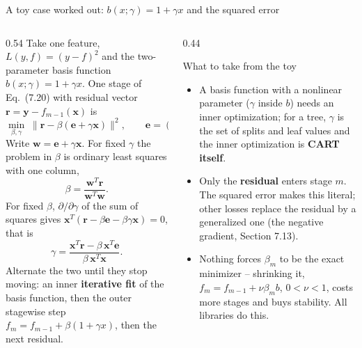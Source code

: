\documentclass[10pt,aspectratio=169]{beamer}
\begin{document}
\begin{frame}{A toy case worked out: $b(x;\gamma)=1+\gamma x$ and the squared error}
\begin{columns}[T]
\begin{column}{0.54\textwidth}
\footnotesize
Take one feature, $L(y,f)=(y-f)^2$ and the two-parameter basis function
$b(x;\gamma)=1+\gamma x$.  One stage of Eq.\ (7.20) with residual vector
$\bm{r}=\bm{y}-f_{m-1}(\bm{x})$ is
\[
\min_{\beta,\gamma}\;\big\|\bm{r}-\beta(\bm{e}+\gamma\bm{x})\big\|^2,
\qquad \bm{e}=(1,\dots,1)^T .
\]
Write $\bm{w}=\bm{e}+\gamma\bm{x}$.  For fixed $\gamma$ the problem in
$\beta$ is ordinary least squares with one column,
\[
\beta=\frac{\bm{w}^T\bm{r}}{\bm{w}^T\bm{w}} .
\]
For fixed $\beta$, $\partial/\partial\gamma$ of the sum of squares gives
$\bm{x}^T(\bm{r}-\beta\bm{e}-\beta\gamma\bm{x})=0$, that is
\[
\gamma=\frac{\bm{x}^T\bm{r}-\beta\,\bm{x}^T\bm{e}}{\beta\,\bm{x}^T\bm{x}} .
\]
Alternate the two until they stop moving: an inner \textbf{iterative fit}
of the basis function, then the outer stagewise step
$f_m=f_{m-1}+\beta(1+\gamma x)$, then the next residual.
\end{column}
\begin{column}{0.44\textwidth}
\begin{block}{What to take from the toy}
\footnotesize
\begin{itemize}
  \item A basis function with a nonlinear parameter ($\gamma$ inside $b$)
    needs an inner optimization; for a tree, $\gamma$ is the set of splits and
    leaf values and the inner optimization is \textbf{CART itself}.
  \item Only the \textbf{residual} enters stage $m$.  The squared error makes
    this literal; other losses replace the residual by a generalized one (the
    negative gradient, Section 7.13).
  \item Nothing forces $\beta_m$ to be the exact minimizer -- shrinking it,
    $f_m=f_{m-1}+\nu\beta_m b$, $0<\nu<1$, costs more stages and buys
    stability.  All libraries do this.
\end{itemize}
\end{block}
\end{column}
\end{columns}
\end{frame}
\end{document}
